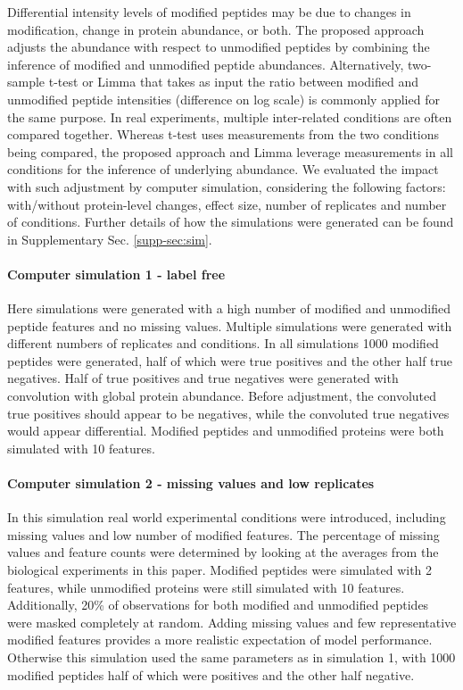 \documentclass[mcp]{article}
\numberwithin{figure}{section} %
\numberwithin{table}{section}
\begin{document}
Differential intensity levels of modified peptides may be due to changes in modification, change in protein abundance, or both. The proposed approach adjusts the abundance with respect to unmodified peptides by combining the inference of modified and unmodified peptide abundances. Alternatively, two-sample t-test or Limma that takes as input the ratio between modified and unmodified peptide intensities (difference on log scale) is commonly applied for the same purpose. In real experiments, multiple inter-related conditions are often compared together. Whereas t-test uses measurements from the two conditions being compared, the proposed approach and Limma leverage measurements in all conditions for the inference of underlying abundance. We evaluated the impact with such adjustment by computer simulation, considering the following factors: with/without protein-level changes, effect size, number of replicates and number of conditions. Further details of how the simulations were generated can be found in Supplementary Sec. \ref{supp-sec:sim}. 

\paragraph*{Computer simulation 1 - label free} 

Here simulations were generated with a high number of modified and unmodified peptide features and no missing values. Multiple simulations were generated with different numbers of replicates and conditions. In all simulations 1000 modified peptides were generated, half of which were true positives and the other half true negatives. Half of true positives and true negatives were generated with convolution with global protein abundance. Before adjustment, the convoluted true positives should appear to be negatives, while the convoluted true negatives would appear differential. Modified peptides and unmodified proteins were both simulated with 10 features.

\paragraph*{Computer simulation 2 - missing values and low replicates} 

In this simulation real world experimental conditions were introduced, including missing values and low number of modified features. The percentage of missing values and feature counts were determined by looking at the averages from the biological experiments in this paper. Modified peptides were simulated with 2 features, while unmodified proteins were still simulated with 10 features. Additionally, 20\% of observations for both modified and unmodified peptides were masked completely at random. Adding missing values and few representative modified features provides a more realistic expectation of model performance. Otherwise this simulation used the same parameters as in simulation 1, with 1000 modified peptides half of which were positives and the other half negative.
\end{document}
